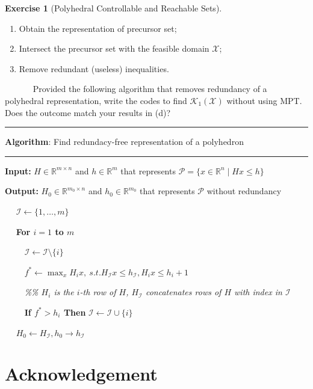 \documentclass[
]{book}
\providecommand{\tightlist}{%
  \setlength{\itemsep}{0pt}\setlength{\parskip}{0pt}}
\theoremstyle{definition}
\theoremstyle{definition}
\theoremstyle{definition}
\newtheorem{exercise}{Exercise}[chapter]
\theoremstyle{definition}
\theoremstyle{remark}
\begin{document}
\begin{exercise}[Polyhedral Controllable and Reachable Sets]
\begin{enumerate}
\def\labelenumi{(\roman{enumi})}
\tightlist
\item
  Obtain the representation of precursor set;
\item
  Intersect the precursor set with the feasible domain \(\mathcal{X}\);
\item
  Remove redundant (useless) inequalities.
\end{enumerate}

~~~~~~ Provided the following algorithm that removes redundancy of a polyhedral representation, write the codes to find \(\mathcal{K}_1(\mathcal{X})\) without using MPT. Does the outcome match your results in (d)?

\begin{center}\rule{0.5\linewidth}{0.5pt}\end{center}

\textbf{Algorithm}: Find redundacy-free representation of a polyhedron

\begin{center}\rule{0.5\linewidth}{0.5pt}\end{center}

\textbf{Input:} \(H\in\mathbb{R}^{m\times n}\) and \(h\in\mathbb{R}^m\) that represents \(\mathcal{P} = \{x\in\mathbb{R}^n\mid Hx\le h \}\)

\textbf{Output:} \(H_0\in\mathbb{R}^{m_0\times n}\) and \(h_0\in\mathbb{R}^{m_0}\) that represents \(\mathcal{P}\) without redundancy

~~ \(\mathcal{I} \leftarrow \{1,\ldots, m\}\)

~~ \textbf{For \(i=1\) to \(m\)}

~~~~ \(\mathcal{I}\leftarrow \mathcal{I}\setminus\{i\}\)

~~~~ \(f^*\leftarrow\max_x H_i x,\ s.t. H_{\mathcal{I}}x\le h_{\mathcal{I}}, H_i x\le h_i + 1\)

~~~~ \emph{\%\% \(H_i\) is the \(i\)-th row of \(H\), \(H_{\mathcal{I}}\) concatenates rows of \(H\) with index in \(\mathcal{I}\)}

~~~~ \textbf{If \(f^* > h_i\) Then }\(\mathcal{I}\leftarrow \mathcal{I}\cup \{i\}\)

~~ \(H_0\leftarrow H_{\mathcal{I}}, h_0\rightarrow h_{\mathcal{I}}\)
\end{exercise}

\hypertarget{acknowledgement}{%
\chapter*{Acknowledgement}\label{acknowledgement}}
\end{document}
